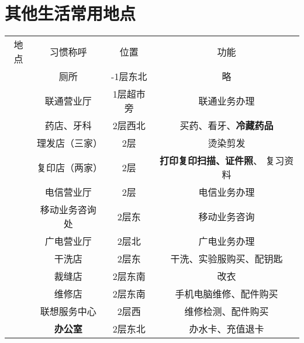 \section[其他生活常用地点]{其他生活常用地点}
\label{common_locations}
\begin{table}[H]
    \centering
    \begin{tabular}{|c|c|c|c|}
        \Xhline{1.2pt}
        地点                    & 习惯称呼          & 位置         & 功能                           \\
        \Xhline{1.2pt}
        \multirow{16}{*}{大服}  & 厕所            & -1层东北      & 略                            \\
        \cline{2-4}
                              & 联通营业厅         & 1层超市旁      & 联通业务办理                       \\
        \cline{2-4}
                              & 药店、牙科         & 2层西北       & 买药、看牙、\textbf{冷藏药品}          \\
        \cline{2-4}
                              & 理发店（三家）       & 2层         & 烫染剪发                         \\
        \cline{2-4}
                              & 复印店（两家）       & 2层         & \textbf{打印复印扫描、证件照}、 复习资料    \\
        \cline{2-4}
                              & 电信营业厅         & 2层         & 电信业务办理                       \\
        \cline{2-4}
                              & 移动业务咨询处       & 2层东        & 移动业务咨询                       \\
        \cline{2-4}
                              & 广电营业厅         & 2层北        & 广电业务办理                       \\
        \cline{2-4}
                              & 干洗店           & 2层东        & 干洗、实验服购买、配钥匙                 \\
        \cline{2-4}
                              & 裁缝店           & 2层东南       & 改衣                           \\
        \cline{2-4}
                              & 维修店           & 2层东南       & 手机电脑维修、配件购买                  \\
        \cline{2-4}
                              & 联想服务中心        & 2层西        & 维修检测、配件购买                    \\
        \cline{2-4}
                              & \textbf{办公室}  & 2层东北       & 办水卡、充值退卡                     \\

\end{tabular}
\end{table}
